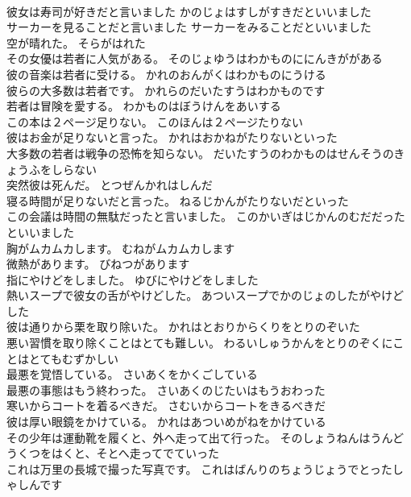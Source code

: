 \documentclass[8pt]{extreport}
\begin{document}
\begin{CJK}{UTF8}{min}
\\	彼女は寿司が好きだと言いました	かのじょはすしがすきだといいました 
\\	サーカーを見ることだと言いました	サーカーをみることだといいました 
\\	空が晴れた。	そらがはれた 
\\	その女優は若者に人気がある。	そのじょゆうはわかものににんきががある 
\\	彼の音楽は若者に受ける。	かれのおんがくはわかものにうける 
\\	彼らの大多数は若者です。	かれらのだいたすうはわかものです 
\\	若者は冒険を愛する。	わかものはぼうけんをあいする 
\\	この本は２ページ足りない。	このほんは２ページたりない 
\\	彼はお金が足りないと言った。	かれはおかねがたりないといった 
\\	大多数の若者は戦争の恐怖を知らない。	だいたすうのわかものはせんそうのきょうふをしらない 
\\	突然彼は死んだ。	とつぜんかれはしんだ 
\\	寝る時間が足りないだと言った。	ねるじかんがたりないだといった 
\\	この会議は時間の無駄だったと言いました。	このかいぎはじかんのむだだったといいました 
\\	胸がムカムカします。	むねがムカムカします 
\\	微熱があります。	びねつがあります 
\\	指にやけどをしました。	ゆびにやけどをしました 
\\	熱いスープで彼女の舌がやけどした。	あついスープでかのじょのしたがやけどした 
\\	彼は通りから栗を取り除いた。	かれはとおりからくりをとりのぞいた 
\\	悪い習慣を取り除くことはとても難しい。	わるいしゅうかんをとりのぞくにことはとてもむずかしい 
\\	最悪を覚悟している。	さいあくをかくごしている 
\\	最悪の事態はもう終わった。	さいあくのじたいはもうおわった 
\\	寒いからコートを着るべきだ。	さむいからコートをきるべきだ 
\\	彼は厚い眼鏡をかけている。	かれはあついめがねをかけている 
\\	その少年は運動靴を履くと、外へ走って出て行った。	そのしょうねんはうんどうくつをはくと、そとへ走ってでていった 
\\	これは万里の長城で撮った写真です。	これはばんりのちょうじょうでとったしゃしんです 

\end{CJK}
\end{document}
